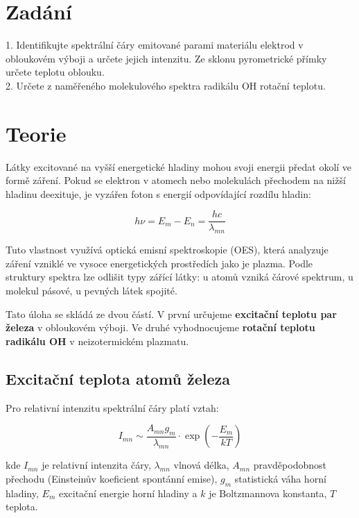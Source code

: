 \documentclass[czech,11pt,a4paper]{article}
\begin{document}
	\begin{multicols}{2}
		\section{Zadání}
		1. Identifikujte spektrální čáry emitované parami materiálu elektrod v obloukovém výboji a určete jejich intenzitu. Ze sklonu pyrometrické přímky určete teplotu oblouku. \\
		2. Určete z naměřeného molekulového spektra radikálu OH rotační teplotu.
		
		
		\section{Teorie}
		
		
		
		Látky excitované na vyšší energetické hladiny mohou svoji energii předat okolí ve formě záření. Pokud se elektron v atomech nebo molekulách přechodem na nižší hladinu deexituje, je vyzářen foton s energií odpovídající rozdílu hladin:
		
		
		\begin{equation}
			h \nu = E_m - E_n = \frac{hc}{\lambda_{mn}}
		\end{equation}
		
		
		Tuto vlastnost využívá optická emisní spektroskopie (OES), která analyzuje záření vzniklé ve vysoce energetických prostředích jako je plazma. Podle struktury spektra lze odlišit typy zářící látky: u atomů vzniká čárové spektrum, u molekul pásové, u pevných látek spojité.
		
		Tato úloha se skládá ze dvou částí. V první určujeme \textbf{excitační teplotu par železa} v obloukovém výboji. Ve druhé vyhodnocujeme \textbf{rotační teplotu radikálu OH} v neizotermickém plazmatu.
		
		\subsection{Excitační teplota atomů železa}
		
		Pro relativní intenzitu spektrální čáry platí vztah:
		
		\begin{equation}			
			I_{mn} \sim \frac{A_{mn} g_m}{\lambda_{mn}} \cdot \exp\left(-\frac{E_m}{kT}\right)		
		\end{equation}
		
		kde $I_{mn}$ je relativní intenzita čáry, $\lambda_{mn}$ vlnová délka, $A_{mn}$ pravděpodobnost přechodu (Einsteinův koeficient spontánní emise), $g_m$ statistická váha horní hladiny, $E_m$ excitační energie horní hladiny a $k$ je Boltzmannova konstanta, $T$ teplota.
		

\end{multicols}
\end{document}
